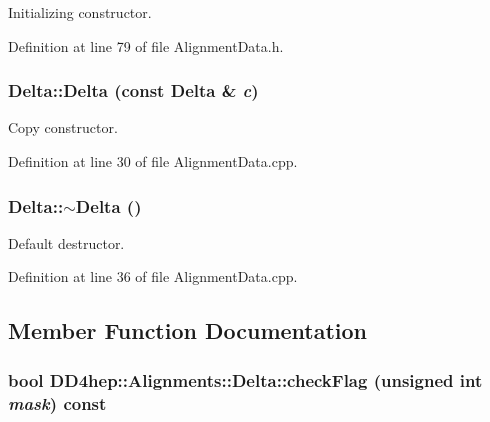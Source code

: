 Initializing constructor. 

Definition at line 79 of file AlignmentData.h.\hypertarget{class_d_d4hep_1_1_alignments_1_1_delta_a3fcd404a6a78a214f1c655a07d3db46d}{
\subsubsection[{Delta}]{\setlength{\rightskip}{0pt plus 5cm}Delta::Delta (const {\bf Delta} \& {\em c})}}
\label{class_d_d4hep_1_1_alignments_1_1_delta_a3fcd404a6a78a214f1c655a07d3db46d}


Copy constructor. 

Definition at line 30 of file AlignmentData.cpp.\hypertarget{class_d_d4hep_1_1_alignments_1_1_delta_a7eff633a0f57a904c8a125178e9ba3b8}{
\subsubsection[{$\sim$Delta}]{\setlength{\rightskip}{0pt plus 5cm}Delta::$\sim$Delta ()}}
\label{class_d_d4hep_1_1_alignments_1_1_delta_a7eff633a0f57a904c8a125178e9ba3b8}


Default destructor. 

Definition at line 36 of file AlignmentData.cpp.

\subsection{Member Function Documentation}
\hypertarget{class_d_d4hep_1_1_alignments_1_1_delta_a032579329da702161e55ec9fc2366955}{
\subsubsection[{checkFlag}]{\setlength{\rightskip}{0pt plus 5cm}bool DD4hep::Alignments::Delta::checkFlag (unsigned int {\em mask}) const}}
\label{class_d_d4hep_1_1_alignments_1_1_delta_a032579329da702161e55ec9fc2366955}


